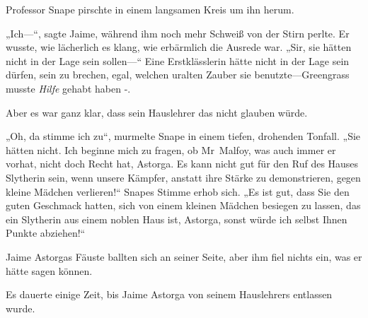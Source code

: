Professor Snape pirschte in einem langsamen Kreis um ihn herum.

„Ich—“, sagte Jaime, während ihm noch mehr Schweiß von der Stirn perlte. Er wusste, wie lächerlich es klang, wie erbärmlich die Ausrede war. „Sir, sie hätten nicht in der Lage sein sollen—“ Eine Erstklässlerin hätte nicht in der Lage sein dürfen, sein  zu brechen, egal, welchen uralten Zauber sie benutzte—Greengrass musste \emph{Hilfe} gehabt haben -.

Aber es war ganz klar, dass sein Hauslehrer das nicht glauben würde.

„Oh, da stimme ich zu“, murmelte Snape in einem tiefen, drohenden Tonfall. „Sie hätten nicht. Ich beginne mich zu fragen, ob Mr~Malfoy, was auch immer er vorhat, nicht doch Recht hat, Astorga. Es kann nicht gut für den Ruf des Hauses Slytherin sein, wenn unsere Kämpfer, anstatt ihre Stärke zu demonstrieren, gegen kleine Mädchen verlieren!“ Snapes Stimme erhob sich. „Es ist gut, dass Sie den guten Geschmack hatten, sich von einem kleinen Mädchen besiegen zu lassen, das ein Slytherin aus einem noblen Haus ist, Astorga, sonst würde ich selbst Ihnen Punkte abziehen!“

Jaime Astorgas Fäuste ballten sich an seiner Seite, aber ihm fiel nichts ein, was er hätte sagen können.

Es dauerte einige Zeit, bis Jaime Astorga von seinem Hauslehrers entlassen wurde.

